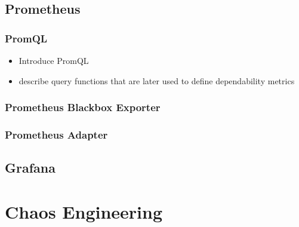 \subsection{Prometheus}

\subsubsection{PromQL} \label{background-promql}

\begin{itemize}
	\item Introduce PromQL
	\item describe query functions that are later used to define dependability metrics
\end{itemize}

\subsubsection{Prometheus Blackbox Exporter}

\subsubsection{Prometheus Adapter}


\subsection{Grafana}


\section{Chaos Engineering}

